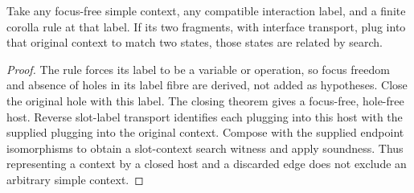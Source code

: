 \begin{theorem}
Take any focus-free simple context, any compatible interaction label, and a
finite corolla rule at that label. If its two fragments, with interface
transport, plug into that original context to match two states, those states
are related by search.
\end{theorem}
\begin{proof}
The rule forces its label to be a variable or operation, so focus freedom and
absence of holes in its label fibre are derived, not added as hypotheses.
Close the original hole with this label. The closing theorem gives a
focus-free, hole-free host. Reverse slot-label transport identifies each
plugging into this host with the supplied plugging into the original context.
Compose with the supplied endpoint isomorphisms to obtain a slot-context search
witness and apply soundness. Thus representing a context by a closed host
and a discarded edge does not exclude an arbitrary simple context.
\end{proof}

